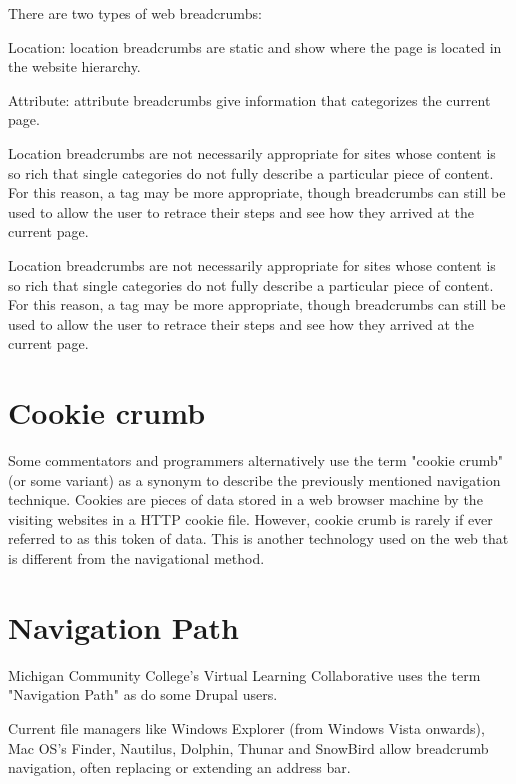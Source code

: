 There are two types of web breadcrumbs:

\begin{compactenum}
\item Location: location breadcrumbs are static and show where the page is located in the website hierarchy.
\item Attribute: attribute breadcrumbs give information that categorizes the current page.
\end{compactenum}

Location breadcrumbs are not necessarily appropriate for sites whose content is so rich that single categories do not fully describe a particular piece of content. For this reason, a tag may be more appropriate, though breadcrumbs can still be used to allow the user to retrace their steps and see how they arrived at the current page.

Location breadcrumbs are not necessarily appropriate for sites whose content is so rich that single categories do not fully describe a particular piece of content. For this reason, a tag may be more appropriate, though breadcrumbs can still be used to allow the user to retrace their steps and see how they arrived at the current page.

\section{Cookie crumb}

Some commentators and programmers alternatively use the term "cookie crumb" (or some variant) as a synonym to describe the previously mentioned navigation technique. Cookies are pieces of data stored in a web browser machine by the visiting websites in a HTTP cookie file. However, cookie crumb is rarely if ever referred to as this token of data. This is another technology used on the web that is different from the navigational method.

\section{Navigation Path}

Michigan Community College's Virtual Learning Collaborative uses the term "Navigation Path" as do some Drupal users.

Current file managers like Windows Explorer (from Windows Vista onwards), Mac OS's Finder, Nautilus, Dolphin, Thunar and SnowBird allow breadcrumb navigation, often replacing or extending an address bar.



